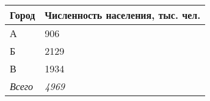 \documentclass{article}
\begin{document}
\begin{minipage}{\textwidth}
\centering
\begin{tabularx}{0.4\textwidth}{YY}
\toprule
\textbf{Город} & \textbf{Численность населения, тыс. чел.} \\
\midrule
А & 906 \\

Б & 2129 \\

В & 1934 \\
\addlinespace
\textit{Всего} & \textit{4969} \\
\bottomrule
\end{tabularx}
\label{task8}
\end{minipage} \\[35pt]
\end{document}
